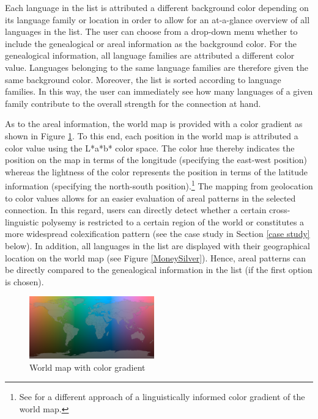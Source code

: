 
Each language in the list is attributed a different background color depending on its language family or location in order to allow for an at-a-glance overview of all languages in the list. The user can choose from a drop-down menu whether to include the genealogical or areal information as the background color. For the genealogical information, all language families are attributed a different color value. Languages belonging to the same language families are therefore given the same background color. Moreover, the list is sorted according to language families. In this way, the user can immediately see how many languages of  a given family contribute to the overall strength for the connection at hand. 

As to the areal information, the world map is provided with a color gradient as shown in Figure \ref{World map}. To this end, each position in the world map is attributed a color value using the L*a*b* color space. The color hue thereby indicates the position on the map in terms of the longitude (specifying the east-west position) whereas the lightness of the color represents the position in terms of the latitude information (specifying the north-south position).\footnote{See  for a different approach of a linguistically informed color gradient of the world map.}
The mapping from geolocation to color values allows for an easier evaluation of areal patterns in the selected connection. In this regard, users can directly detect whether a certain cross-linguistic polysemy is restricted to a certain region of the world or constitutes a more widespread colexification pattern (see the case study in Section \ref{case study} below). In addition, all languages in the list are displayed with their geographical location on the world map (see Figure \ref{MoneySilver}). Hence, areal patterns can be directly compared to the genealogical information in the list (if the first option is chosen).

\begin{figure}[htbp]
\begin{center}
\includegraphics[width=0.48\textwidth]{img/ColorScaleWorld.png}
\caption{World map with color gradient}
\label{World map}
\end{center}
\end{figure}



